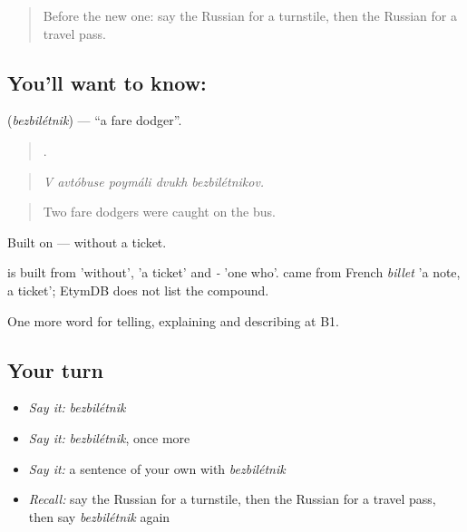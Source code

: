\label{lesson:RU-C417-bezbiletnik}



\begin{quote}
Before the new one: say the Russian for a turnstile, then the Russian for a travel pass.
\end{quote}

\subsection*{You'll want to know: }
\textbf{} (\emph{bezbilétnik}) — \textquotedblleft{}a fare dodger\textquotedblright{}.

\begin{quote}
    .
\end{quote}

\begin{quote}
\emph{V avtóbuse poymáli dvukh bezbilétnikov.}
\end{quote}

\begin{quote}
Two fare dodgers were caught on the bus.
\end{quote}

Built on \emph{ } — without a ticket.

\begin{cousinweb}
\emph{} is built from \emph{} 'without', \emph{} 'a ticket' and \emph{-} 'one who'. \emph{} came from French \emph{billet} 'a note, a ticket'; EtymDB does not list the compound.
\end{cousinweb}

\begin{grammarlens}[title={What you've built}]
One more word for telling, explaining and describing at B1.
\end{grammarlens}

\subsection*{Your turn}
\begin{itemize}
\raggedright
  \item \emph{Say it:} \emph{bezbilétnik}
  \item \emph{Say it:} \emph{bezbilétnik}, once more
  \item \emph{Say it:} a sentence of your own with \emph{bezbilétnik}
  \item \emph{Recall:} say the Russian for a turnstile, then the Russian for a travel pass, then say \emph{bezbilétnik} again
\end{itemize}

